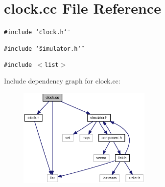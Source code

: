 \section{clock.cc File Reference}
\label{clock_8cc}
{\tt \#include \char`\"{}clock.h\char`\"{}}\par
{\tt \#include \char`\"{}simulator.h\char`\"{}}\par
{\tt \#include $<$list$>$}\par


Include dependency graph for clock.cc:\nopagebreak
\begin{figure}[H]
\begin{center}
\leavevmode
\includegraphics[width=185pt]{clock_8cc__incl}
\end{center}
\end{figure}
